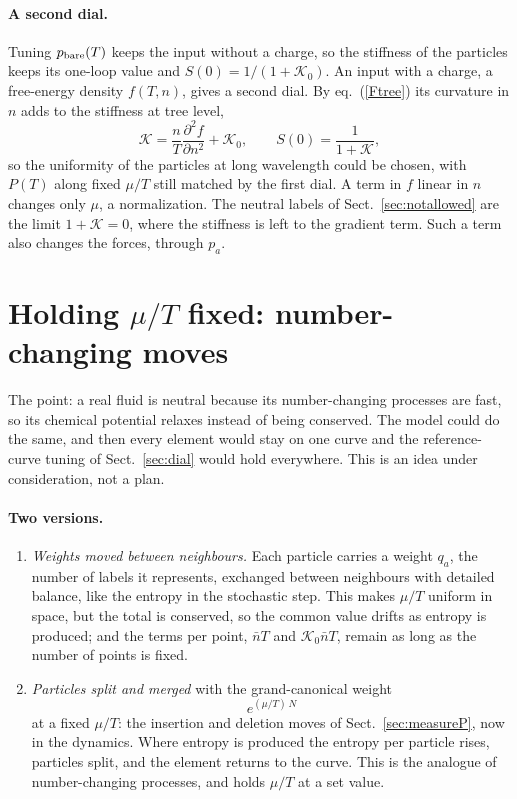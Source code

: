 \documentclass[11pt,aps,preprint,nofootinbib,superscriptaddress,tightenlines]{revtex4-2}
\def\st{\begin{equation}}
\def\stp{\end{equation}}
\def\Eq#1{eq.~(\ref{#1})}
\def\Sect#1{Sect.~\ref{#1}}
\let\oldparagraph\paragraph
\renewcommand{\paragraph}{\par\bigskip\oldparagraph}
\begin{document}
\paragraph{A second dial.}  Tuning $p_{\rm bare}(T)$ keeps the input without a charge, so the stiffness of the particles keeps its one-loop value and
$S(0)=1/(1+\mathcal K_0)$.  An input with a charge, a free-energy density $f(T,n)$, gives a second dial.  By \Eq{Ftree} its curvature in $n$ adds to the
stiffness at tree level,
\st
\mathcal K=\frac nT\frac{\partial^2f}{\partial n^2}+\mathcal K_0,\qquad S(0)=\frac1{1+\mathcal K},
\stp
so the uniformity of the particles at long wavelength could be chosen, with $P(T)$ along fixed $\mu/T$ still matched by the first dial.  A term in $f$ linear
in $n$ changes only $\mu$, a normalization.  The neutral labels of \Sect{sec:notallowed} are the limit $1+\mathcal K=0$, where the stiffness is left to the gradient term.  Such a term also
changes the forces, through $p_a$.

\section{Holding $\mu/T$ fixed: number-changing moves}
\label{sec:numberchange}

The point: a real fluid is neutral because its number-changing processes are fast, so its chemical potential relaxes instead of being conserved.  The model
could do the same, and then every element would stay on one curve and the reference-curve tuning of \Sect{sec:dial} would hold everywhere.  This is an idea
under consideration, not a plan.

\paragraph{Two versions.}
\begin{enumerate}
\item \emph{Weights moved between neighbours.}  Each particle carries a weight $q_a$, the number of labels it represents, exchanged between neighbours with
  detailed balance, like the entropy in the stochastic step.  This makes $\mu/T$ uniform in space, but the total is conserved, so the common value drifts as
  entropy is produced; and the terms per point, $\bar nT$ and $\mathcal K_0\bar nT$, remain as long as the number of points is fixed.
\item \emph{Particles split and merged} with the grand-canonical weight
  \st
  e^{(\mu/T)\,N}
  \stp
  at a fixed $\mu/T$: the insertion and deletion moves of \Sect{sec:measureP}, now in the dynamics.  Where entropy is produced the entropy per particle rises,
  particles split, and the element returns to the curve.  This is the analogue of number-changing processes, and holds $\mu/T$ at a set value.
\end{enumerate}
\end{document}
